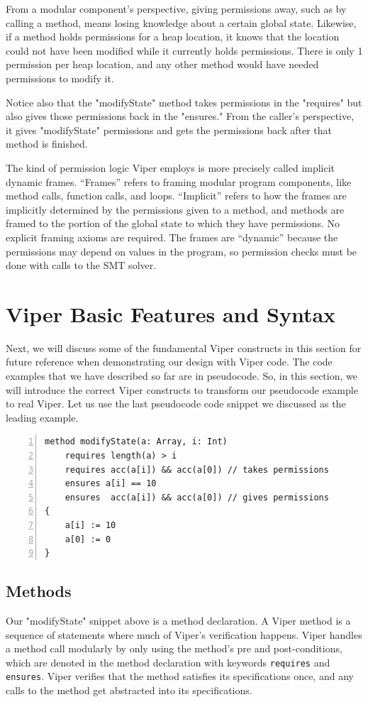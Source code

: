 \documentclass[msc,oneside]{ubcthesis}
\theoremstyle{definition}
\begin{document}
From a modular component's perspective, giving permissions away, such as by calling a method, means losing knowledge about a certain global state. Likewise, if a method holds permissions for a heap location, it knows that the location could not have been modified while it currently holds permissions. There is only 1 permission per heap location, and any other method would have needed permissions to modify it. 

Notice also that the "modifyState" method takes permissions in the "requires" but also gives those permissions back in the "ensures." From the caller's perspective, it gives "modifyState" permissions and gets the permissions back after that method is finished.

The kind of permission logic Viper employs is more precisely called implicit dynamic frames. ``Frames'' refers to framing modular program components, like method calls, function calls, and loops. ``Implicit'' refers to how the frames are implicitly determined by the permissions given to a method, and methods are framed to the portion of the global state to which they have permissions. No explicit framing axioms are required. The frames are ``dynamic'' because the permissions may depend on values in the program, so permission checks must be done with calls to the SMT solver.

\section{Viper Basic Features and Syntax}
Next, we will discuss some of the fundamental Viper constructs in this section for future reference when demonstrating our design with Viper code. The code examples that we have described so far are in pseudocode. So, in this section, we will introduce the correct Viper constructs to transform our pseudocode example to real Viper. Let us use the last pseudocode code snippet we discussed as the leading example.

\begin{lstlisting}[language=silver,numbers=left, firstnumber=1, stepnumber=1]
method modifyState(a: Array, i: Int)
    requires length(a) > i
    requires acc(a[i]) && acc(a[0]) // takes permissions
    ensures a[i] == 10
    ensures  acc(a[i]) && acc(a[0]) // gives permissions
{
    a[i] := 10
    a[0] := 0
}
\end{lstlisting}

\subsection{Methods}
Our "modifyState" snippet above is a method declaration. A Viper method is a sequence of statements where much of Viper's verification happens. Viper handles a method call modularly by only using the method's pre and post-conditions, which are denoted in the method declaration with keywords \lstinline{requires} and \lstinline{ensures}. Viper verifies that the method satisfies its specifications once, and any calls to the method get abstracted into its specifications.
\end{document}
